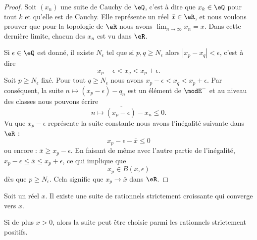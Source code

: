 \begin{proof}
    Soit \( (x_n)\) une suite de Cauchy de \( \eQ\), c'est à dire que \( x_k\in \eQ\) pour tout \( k\) et qu'elle est de Cauchy. Elle représente un réel \( \bar x\in \eR\), et nous voulons prouver que pour la topologie de \( \eR\) nous avons \( \lim_{n\to \infty} x_n=\bar x\). Dans cette dernière limite, chacun des \( x_n\) est vu dans \( \eR\).


    Si \( \epsilon\in \eQ\) est donné, il existe \( N_{\epsilon}\) tel que si \( p,q\geq N_{\epsilon}\) alors \( | x_p-x_q |< \epsilon\), c'est à dire
    \begin{equation}
        x_p-\epsilon<x_q<x_p+\epsilon.
    \end{equation}
    Soit \( p\geq N_{\epsilon}\) fixé. Pour tout \( q\geq N_{\epsilon}\) nous avons \(  x_p-\epsilon<x_q<x_p+\epsilon \). Par conséquent, la suite \( n\mapsto (x_p-\epsilon)-q_n\) est un élément de \( \modE^-\) et au niveau des classes nous pouvons écrire
    \begin{equation}
        \overline{ n\mapsto (x_p-\epsilon)-x_n }\leq 0.
    \end{equation}
    Vu que \( x_p-\epsilon\) représente la suite constante nous avons l'inégalité suivante dans \( \eR\) :
    \begin{equation}
        x_p-\epsilon-\bar x\leq 0
    \end{equation}
    ou encore : \( \bar x\geq x_p-\epsilon\). En faisant de même avec l'autre partie de l'inégalité, \( x_p-\epsilon\leq \bar x\leq x_p+\epsilon\), ce qui implique que
    \begin{equation}
        x_p\in B(\bar x,\epsilon)
    \end{equation}
    dès que \( p\geq N_{\epsilon}\). Cela signifie que \( x_p\to \bar x\) dans \( \eR\).
\end{proof}

\begin{proposition}     \label{PROPooFGBOooHiZqbs}
    Soit un réel \( x\). Il existe une suite de rationnels strictement croissante qui converge vers \( x\).

    Si de plus \( x>0\), alors la suite peut être choisie parmi les rationnels strictement positifs.
\end{proposition}


